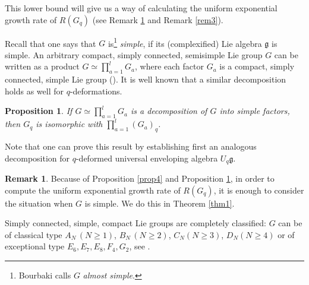 \documentclass[11 pt, leqno]{amsart}
\newcommand{\mf}{\mathfrak}
\newtheorem{proposition}[theorem]{Proposition}
\theoremstyle{definition}
\newtheorem{remark}[theorem]{Remark}
\numberwithin{equation}{section}
\begin{document}
This lower bound will give us a way of calculating the uniform exponential growth rate of $R(G_q)$ (see Remark \ref{rem1} and Remark \ref{rem3}).

Recall that one says that $G$ is\footnote{Bourbaki \cite{Bourbaki1-3} calls $G$ \emph{almost simple}.} \emph{simple}, if its (complexified) Lie algebra $\mf{g}$ is simple. An arbitrary compact, simply connected, semisimple Lie group $G$ can be written as a product $G\simeq \prod_{a=1}^{l} G_{a}$, where each factor $G_a$ is a compact, simply connected, simple Lie group (\cite[Proposition III.9.28]{Bourbaki1-3}). It is well known that a similar decomposition holds as well for $q$-deformations. 

\begin{proposition}\label{prop8}
If $G\simeq \prod_{a=1}^{l}G_a$ is a decomposition of $G$ into simple factors, then $G_q$ is isomorphic with $\prod_{a=1}^{l} (G_{a})_q$.
\end{proposition}

Note that one can prove this result by establishing first an analogous decomposition for $q$-deformed universal enveloping algebra $U_q \mf{g}$.

\begin{remark}\label{rem1}
Because of Proposition \ref{prop4} and Proposition \ref{prop8}, in order to compute the uniform exponential growth rate of $R(G_q)$, it is enough to consider the situation when $G$ is simple. We do this in Theorem \ref{thm1}.
\end{remark}

Simply connected, simple, compact Lie groups are completely classified: $G$ can be of classical type $A_N\,(N\ge 1)$, $B_N\,(N\ge 2)$, $C_N(N\ge 3)$, $D_N(N\ge 4)$ or of exceptional type $E_6,E_7,E_8,F_4,G_2$, see \cite[Section 11.4]{Humphreys}.
\end{document}

